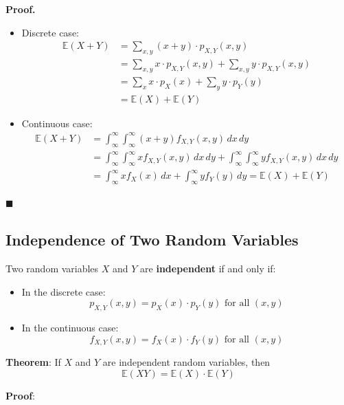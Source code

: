 \documentclass[twoside]{book}
\begin{document}
\textbf{Proof.}  
\begin{itemize}
  \item Discrete case:
  \begin{align*}
  \mathbb{E}(X + Y) &= \sum_{x, y} (x + y) \cdot p_{X,Y}(x,y)\\
  &= \sum_{x, y} x \cdot p_{X,Y}(x,y) + \sum_{x, y} y \cdot p_{X,Y}(x,y)\\
  &= \sum_{x} x \cdot p_X(x) + \sum_{y} y \cdot p_Y(y)\\
  &= \mathbb{E}(X) + \mathbb{E}(Y)
  \end{align*}

  \item Continuous case:
  \begin{align*}
    \mathbb{E}(X + Y) &= \int_{\infty}^{\infty}\int_{\infty}^{\infty} (x + y) f_{X,Y}(x, y) \, dx \, dy \\
  &= \int_{\infty}^{\infty}\int_{\infty}^{\infty} x f_{X,Y}(x, y) \, dx \, dy + \int_{\infty}^{\infty}\int_{\infty}^{\infty} y f_{X,Y}(x, y) \, dx \, dy \\
  &= \int_{\infty}^{\infty} x f_X(x) \, dx + \int_{\infty}^{\infty} y f_Y(y) \, dy = \mathbb{E}(X) + \mathbb{E}(Y)
  \end{align*}
\end{itemize}
\hfill\(\blacksquare\)

\subsection{Independence of Two Random Variables}

Two random variables \( X \) and \( Y \) are \textbf{independent} if and only if:
\begin{itemize}
  \item In the discrete case: $$p_{X,Y}(x, y) = p_X(x) \cdot p_Y(y) \text{ for all } ( x, y )$$
  \item In the continuous case: $$f_{X,Y}(x, y) = f_X(x) \cdot f_Y(y) \text{ for all } ( x, y )$$
\end{itemize}

\begin{textbox}
\textbf{Theorem}: If \( X \) and \( Y \) are independent random variables, then
\[
\mathbb{E}(XY) = \mathbb{E}(X) \cdot \mathbb{E}(Y)
\]
\end{textbox}

\textbf{Proof}:
\end{document}
